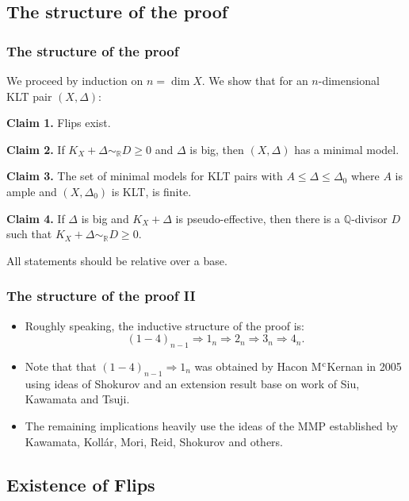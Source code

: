 \documentclass{beamer}
\theoremstyle{plain}
\theoremstyle{definition}
\theoremstyle{remark}
\def\Q{\mathbb {Q}}
\begin{document}
\subsection{The structure of the proof}
\begin{frame}
\frametitle{The structure of the proof}
We proceed by induction on $n=\dim X$. We show that for an $n$-dimensional KLT pair $(X,\Delta)$:

{\bf Claim 1.} Flips exist.

{\bf Claim 2.} If $K_X+\Delta \sim _{\mathbb{R}}D\geq 0$ and $\Delta$ is big, then
$(X,\Delta )$ has a minimal model.

{\bf Claim 3.} The set of minimal models for KLT pairs with $A\leq \Delta
\leq \Delta _0$ where $A$ is ample and $(X,\Delta _0)$ is KLT, is finite.

{\bf Claim 4.} If $\Delta $ is big and $K_X+\Delta$ is pseudo-effective, then there is a $\Q$-divisor $D$ such that
$K_X+\Delta \sim _{\mathbb {R}}D\geq 0$.

All statements should be relative over a base.

\end{frame}
\begin{frame}
\frametitle{The structure of the proof II}
\begin{itemize}
\item Roughly speaking, the inductive structure of the proof is:
$$ (1-4)_{n-1}\Rightarrow 1_n\Rightarrow 2_n\Rightarrow 3_n \Rightarrow 4_n.$$
\item Note that that $(1-4)_{n-1}\Rightarrow 1_n$ was obtained by
Hacon M$^{\rm c}$Kernan in 2005 using ideas of Shokurov and 
an extension result base on work of Siu, Kawamata and Tsuji.

\item The remaining implications heavily use the ideas of the MMP established by
Kawamata, Koll\'ar, Mori, Reid, Shokurov and others.
\end{itemize}


\end{frame}

\subsection{Existence of Flips}
\end{document}
